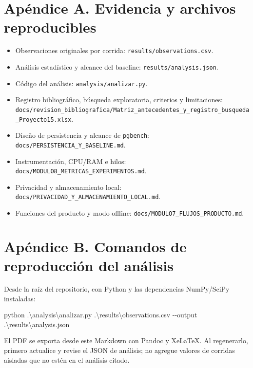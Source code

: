 \documentclass[
  spanish,
  12pt,
  a4paper,
]{article}
\newenvironment{Shaded}{}{}
\newcommand{\FunctionTok}[1]{\textcolor[rgb]{0.02,0.16,0.49}{#1}}
\newcommand{\NormalTok}[1]{#1}
\newcommand{\OperatorTok}[1]{\textcolor[rgb]{0.40,0.40,0.40}{#1}}
\providecommand{\tightlist}{%
  \setlength{\itemsep}{0pt}\setlength{\parskip}{0pt}}
\begin{document}
\section{Apéndice A. Evidencia y archivos
reproducibles}\label{apuxe9ndice-a.-evidencia-y-archivos-reproducibles}

\begin{itemize}
\tightlist
\item
  Observaciones originales por corrida:
  \texttt{results/observations.csv}.
\item
  Análisis estadístico y alcance del baseline:
  \texttt{results/analysis.json}.
\item
  Código del análisis: \texttt{analysis/analizar.py}.
\item
  Registro bibliográfico, búsqueda exploratoria, criterios y
  limitaciones:
  \texttt{docs/revision\_bibliografica/Matriz\_antecedentes\_y\_registro\_busqueda\_Proyecto15.xlsx}.
\item
  Diseño de persistencia y alcance de \texttt{pgbench}:
  \texttt{docs/PERSISTENCIA\_Y\_BASELINE.md}.
\item
  Instrumentación, CPU/RAM e hilos:
  \texttt{docs/MODULO8\_METRICAS\_EXPERIMENTOS.md}.
\item
  Privacidad y almacenamiento local:
  \texttt{docs/PRIVACIDAD\_Y\_ALMACENAMIENTO\_LOCAL.md}.
\item
  Funciones del producto y modo offline:
  \texttt{docs/MODULO7\_FLUJOS\_PRODUCTO.md}.
\end{itemize}

\section{Apéndice B. Comandos de reproducción del
análisis}\label{apuxe9ndice-b.-comandos-de-reproducciuxf3n-del-anuxe1lisis}

Desde la raíz del repositorio, con Python y las dependencias NumPy/SciPy
instaladas:

\begin{Shaded}
\begin{Highlighting}[]
\NormalTok{python }\OperatorTok{.}\NormalTok{\textbackslash{}analysis\textbackslash{}analizar}\OperatorTok{.}\FunctionTok{py} \OperatorTok{.}\NormalTok{\textbackslash{}results\textbackslash{}observations}\OperatorTok{.}\FunctionTok{csv} \OperatorTok{{-}{-}}\NormalTok{output }\OperatorTok{.}\NormalTok{\textbackslash{}results\textbackslash{}analysis}\OperatorTok{.}\FunctionTok{json}
\end{Highlighting}
\end{Shaded}

El PDF se exporta desde este Markdown con Pandoc y XeLaTeX. Al
regenerarlo, primero actualice y revise el JSON de análisis; no agregue
valores de corridas aisladas que no estén en el análisis citado.
\end{document}
